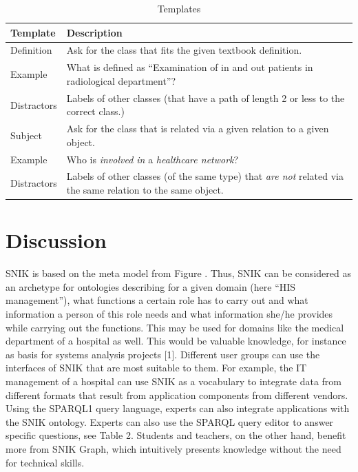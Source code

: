 \documentclass[sw]{iosart2x}
\begin{document}
\begin{table}
\caption{Templates}
\label{tab:templates}
\begin{tabulary}{\textwidth}{lL}
\toprule
\textbf{Template}	&\textbf{Description}\\
\midrule
Definition		&Ask for the class that fits the given textbook definition.\\
Example			&What is defined as \enquote{Examination of in and out patients in radiological department}?\\
Distractors		&Labels of other classes (that have a path of length 2 or less to the correct class.)\\
\midrule
Subject			&Ask for the class that is related via a given relation to a given object.\\
Example			&Who is \emph{involved in} a \emph{healthcare network}?\\
Distractors		&Labels of other classes (of the same type) that \emph{are not} related via the same relation to the same object.\\
\bottomrule
\end{tabulary}
\end{table}



\section{Discussion}
SNIK is based on the meta model from Figure .
Thus, SNIK can be considered as an archetype for ontologies describing for a given domain (here \enquote{HIS management}), what functions a certain role has to carry out and what information a person of this role needs and what information she/he provides while carrying out the functions.
This may be used for domains like the medical department of a hospital as well.
This would be valuable knowledge, for instance as basis for systems analysis projects [1].
Different user groups can use the interfaces of SNIK that are most suitable to them.
For example, the IT management of a hospital can use SNIK as a vocabulary to integrate data from different formats that result from application components from different vendors.
Using the SPARQL1 query language, experts can also integrate applications with the SNIK ontology.
 Experts can also use the SPARQL query editor to answer specific questions, see Table 2.
Students and teachers, on the other hand, benefit more from SNIK Graph, which intuitively presents knowledge without the need for technical skills.
\end{document}
